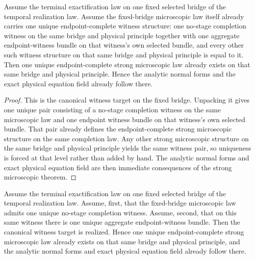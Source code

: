 \begin{theorem}
\label{thm:law-native-flagship-witness-target-recovers-the-strong-microscopic-package}
Assume the terminal exactification law on one fixed selected bridge of the
temporal realization law. Assume the fixed-bridge microscopic law itself already
carries one unique endpoint-complete witness structure: one no-stage completion
witness on the same bridge and physical principle together with one aggregate
endpoint-witness bundle on that witness's own selected bundle, and
every other such witness structure on that same bridge and physical principle is equal to it. Then one unique
endpoint-complete strong microscopic law already exists on that same bridge and
physical principle. Hence the analytic normal forms and the exact physical
equation field already follow there.
\end{theorem}

\begin{proof}
This is the canonical witness target on the fixed bridge. Unpacking it gives one unique
pair consisting of a no-stage completion witness on the same microscopic law
and one endpoint witness bundle on that witness's own selected bundle. That
pair already defines the endpoint-complete strong microscopic structure on the
same completion law. Any other strong microscopic structure on the same bridge
and physical principle yields the same witness pair, so uniqueness is forced
at that level rather than added by hand. The analytic normal forms and
exact physical equation field are then immediate consequences of the
strong microscopic theorem.
\end{proof}

\begin{theorem}
\label{thm:canonical-completion-witness-bundle-target-implies-canonical-flagship-witness-target}
Assume the terminal exactification law on one fixed selected bridge of the
temporal realization law. Assume, first, that the fixed-bridge microscopic law
admits one unique no-stage completion witness. Assume, second, that on this
same witness there is one unique aggregate endpoint-witness bundle.
Then the canonical witness target is realized. Hence one
unique endpoint-complete strong microscopic law already exists on that same
bridge and physical principle, and the analytic normal forms and exact
physical equation field already follow there.
\end{theorem}

